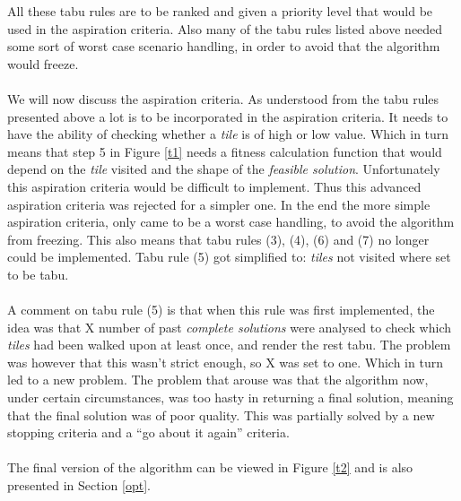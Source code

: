 All these tabu rules are to be ranked and given a priority level that would be used in the aspiration criteria. Also many of the tabu rules listed above needed some sort of worst case scenario handling, in order to avoid that the algorithm would freeze.\\
\\We will now discuss the aspiration criteria. As understood from the tabu rules presented above a lot is to be incorporated in the aspiration criteria. It needs to have the ability of checking whether a \emph{tile} is of high or low value. Which in turn means that step 5 in Figure \ref{t1} needs a fitness calculation function that would depend on the \emph{tile} visited and the shape of the \emph{feasible solution}. Unfortunately this aspiration criteria would be difficult to implement. Thus this advanced aspiration criteria was rejected for a simpler one. In the end the more simple aspiration criteria, only came to be a worst case handling, to avoid the algorithm from freezing. This also means that tabu rules (3), (4), (6) and (7) no longer could be implemented. Tabu rule (5) got simplified to: \emph{tiles} not visited where set to be tabu.\\
\\A comment on tabu rule (5) is that when this rule was first implemented, the idea was that X number of past \emph{complete solutions} were analysed to check which \emph{tiles} had been walked upon at least once, and render the rest tabu. The problem was however that this wasn't strict enough, so X was set to one. Which in turn led to a new problem. The problem that arouse was that the algorithm now, under certain circumstances, was too hasty in returning a final solution, meaning that the final solution was of poor quality. This was partially solved by a new stopping criteria and a ``go about it again'' criteria.\\
\\The final version of the algorithm can be viewed in Figure \ref{t2} and is also presented in Section \ref{opt}.
